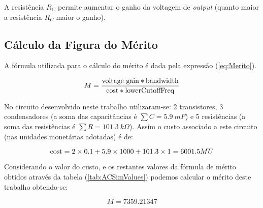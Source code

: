 A resistência $R_C$ permite aumentar o ganho da voltagem de \emph{output} (quanto maior a resistência $R_C$ maior o ganho).

\subsection{Cálculo da Figura do Mérito}

A fórmula utilizada para o cálculo do mérito é dada pela expressão (\ref{eq:Merito}).

\begin{equation}
    M = \frac{\textnormal{voltage gain} * \textnormal{bandwidth}}{\textnormal{cost} * \textnormal{lowerCutoffFreq}}
    \label{eq:Merito}
\end{equation}

No circuito desenvolvido neste trabalho utilizaram-se: 2 transistores, 3 condensadores (a soma das capacitâncias é $\sum C = 5.9\: mF$) 
e 5 resistências (a soma das resistências é $\sum R = 101.3 \: k\Omega$). 
Assim o custo associado a este circuito (nas unidades monetárias adotadas) é de:

\begin{equation}
  \label{eq:Custo}
  \textnormal{cost} = 2 \times 0.1 + 5.9 \times 1000 + 101.3 \times 1 = 6001.5 MU 
\end{equation}

Considerando o valor do custo, e os restantes valores da fórmula de mérito obtidos através da tabela (\ref{tab:ACSimValues})
podemos calcular o mérito deste trabalho obtendo-se:

\begin{equation}
  \label{eq:ValorMerito}
  M = 7359.21347
\end{equation}